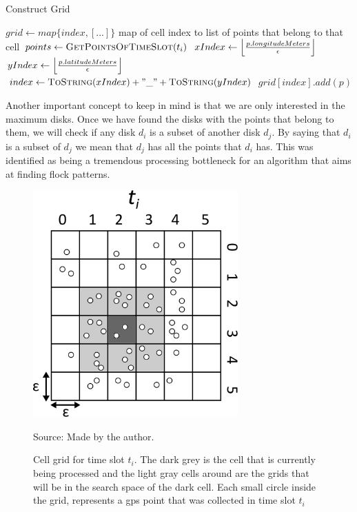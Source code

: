 \begin{algorithm}[h!]
\caption{Construct Grid}
\label{alg:grid}
\begin{algorithmic}[1]
    \State $grid \gets map\{index, [...]\}$ \Comment map of cell index to list of points that belong to that cell
    \State $points \gets \Call{GetPointsOfTimeSlot}{t_i}$
    \State
        \State $xIndex \gets \floor*{\frac{p.longitudeMeters}{\epsilon}}$
        \State $yIndex \gets \floor*{\frac{p.latitudeMeters}{\epsilon}}$
        \State
        \State $index \gets \Call{ToString}{xIndex} + "\_" + \Call{ToString}{yIndex}$
        \State $grid[index].add(p)$
    \EndFor
\end{algorithmic}
\end{algorithm}

Another important concept to keep in mind is that we are only interested in the maximum disks. Once we have found the
disks with the points that belong to them, we will check if any disk $d_i$ is a subset of another disk $d_j$. By saying
that $d_i$ is a subset of $d_j$ we mean that $d_j$ has all the points that $d_i$ has. This was identified as being a
tremendous processing bottleneck for an algorithm that aims at finding flock patterns.

\begin{figure}[h!]
    \centering
    \caption{Cell grid for time slot $t_i$. The dark grey is the cell that is currently being processed and the light
        gray cells around are the grids that will be in the search space of the dark cell. Each small circle inside the
        grid, represents a \ac{gps} point that was collected in time slot $t_i$}
    \centerline{\includegraphics[width=0.7\textwidth]{images/grid.eps}}
    \footnotesize{Source: Made by the author.}
    \label{fig:grid}
\end{figure}
